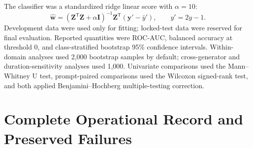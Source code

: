 \documentclass[11pt,a4paper]{article}
\begin{document}
The classifier was a standardized ridge linear score with $\alpha=10$:
\begin{equation}
\hat{\mathbf{w}}=(\mathbf{Z}^{\mathsf T}\mathbf{Z}+\alpha\mathbf{I})^{-1}
\mathbf{Z}^{\mathsf T}(\mathbf{y}'-\bar{y}'),\qquad y'=2y-1.
\label{eq:ridge}
\end{equation}
Development data were used only for fitting; locked-test data were reserved for final evaluation. Reported quantities were ROC-AUC, balanced accuracy at threshold 0, and class-stratified bootstrap 95\% confidence intervals. Within-domain analyses used 2,000 bootstrap samples by default; cross-generator and duration-sensitivity analyses used 1,000. Univariate comparisons used the Mann--Whitney U test, prompt-paired comparisons used the Wilcoxon signed-rank test, and both applied Benjamini--Hochberg multiple-testing correction.

\section{Complete Operational Record and Preserved Failures}
\label{sec:operations}
\end{document}
